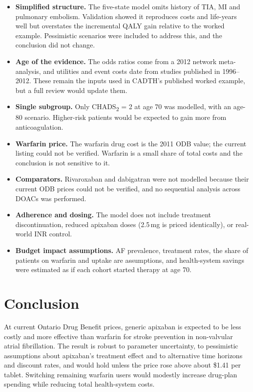 \documentclass[11pt,letterpaper]{article}
\begin{document}
\begin{itemize}
  \item \textbf{Simplified structure.} The five-state model omits history of TIA, MI and pulmonary
        embolism. Validation showed it reproduces costs and life-years well but overstates the
        incremental QALY gain relative to the worked example. Pessimistic scenarios were included
        to address this, and the conclusion did not change.
  \item \textbf{Age of the evidence.} The odds ratios come from a 2012 network meta-analysis, and
        utilities and event costs date from studies published in 1996--2012. These remain the
        inputs used in CADTH's published worked example, but a full review would update them.
  \item \textbf{Single subgroup.} Only CHADS\textsubscript{2} = 2 at age 70 was modelled, with an
        age-80 scenario. Higher-risk patients would be expected to gain more from anticoagulation.
  \item \textbf{Warfarin price.} The warfarin drug cost is the 2011 ODB value; the current listing
        could not be verified. Warfarin is a small share of total costs and the conclusion is not
        sensitive to it.
  \item \textbf{Comparators.} Rivaroxaban and dabigatran were not modelled because their current
        ODB prices could not be verified, and no sequential analysis across DOACs was performed.
  \item \textbf{Adherence and dosing.} The model does not include treatment discontinuation, reduced
        apixaban doses (2.5\,mg is priced identically), or real-world INR control.
  \item \textbf{Budget impact assumptions.} AF prevalence, treatment rates, the share of patients
        on warfarin and uptake are assumptions, and health-system savings were estimated as if each
        cohort started therapy at age 70.
\end{itemize}

\section{Conclusion}

At current Ontario Drug Benefit prices, generic apixaban is expected to be less costly and more
effective than warfarin for stroke prevention in non-valvular atrial fibrillation. The result is
robust to parameter uncertainty, to pessimistic assumptions about apixaban's treatment effect and
to alternative time horizons and discount rates, and would hold unless the price rose above about
\$1.41 per tablet. Switching remaining warfarin users would modestly increase drug-plan spending
while reducing total health-system costs.
\end{document}
